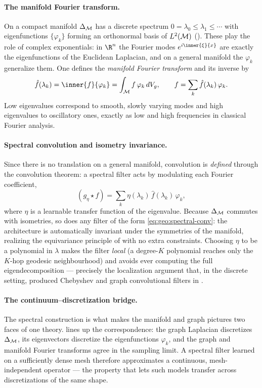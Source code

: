 \paragraph{The manifold Fourier transform.}
On a compact manifold $\Delta_{\mathcal{M}}$ has a discrete spectrum
$0 = \lambda_0 \le \lambda_1 \le \cdots$ with eigenfunctions $\{\varphi_k\}$
forming an orthonormal basis of $L^2(\mathcal{M})$ (). These play
the role of complex exponentials: in $\R^n$ the Fourier modes $e^{i\inner{\xi}{x}}$
are exactly the eigenfunctions of the Euclidean Laplacian, and on a general
manifold the $\varphi_k$ generalize them. One defines the \emph{manifold Fourier
transform} and its inverse by
\[
  \hat f(\lambda_k) = \inner{f}{\varphi_k} = \int_\M f\, \varphi_k\, dV_g,
  \qquad
  f = \sum_{k} \hat f(\lambda_k)\, \varphi_k .
\]
Low eigenvalues correspond to smooth, slowly varying modes and high eigenvalues
to oscillatory ones, exactly as low and high frequencies in classical Fourier
analysis.

\paragraph{Spectral convolution and isometry invariance.}
Since there is no translation on a general manifold, convolution is
\emph{defined} through the convolution theorem: a spectral filter acts by
modulating each Fourier coefficient,
\begin{equation}
\label{eq:geo:spectral-conv}
  (g_\eta \star f) = \sum_k \eta(\lambda_k)\, \hat f(\lambda_k)\, \varphi_k,
\end{equation}
where $\eta$ is a learnable transfer function of the eigenvalue. Because
$\Delta_{\mathcal{M}}$ commutes with isometries, so does any filter of the form
\eqref{eq:geo:spectral-conv}: the architecture is automatically invariant under
the symmetries of the manifold, realizing the equivariance principle of
 with no extra constraints. Choosing $\eta$ to be a polynomial
in $\lambda$ makes the filter \emph{local} (a degree-$K$ polynomial reaches only
the $K$-hop geodesic neighbourhood) and avoids ever computing the full
eigendecomposition --- precisely the localization argument that, in the discrete
setting, produced Chebyshev and graph convolutional filters in .

\paragraph{The continuum--discretization bridge.}
The spectral construction is what makes the manifold and graph pictures two faces
of one theory.  lines up the correspondence: the graph
Laplacian discretizes $\Delta_{\mathcal{M}}$, its eigenvectors discretize the
eigenfunctions $\varphi_k$, and the graph and manifold Fourier transforms agree
in the sampling limit. A spectral filter learned on a sufficiently dense mesh
therefore approximates a continuous, mesh-independent operator --- the property
that lets such models transfer across discretizations of the same shape.

